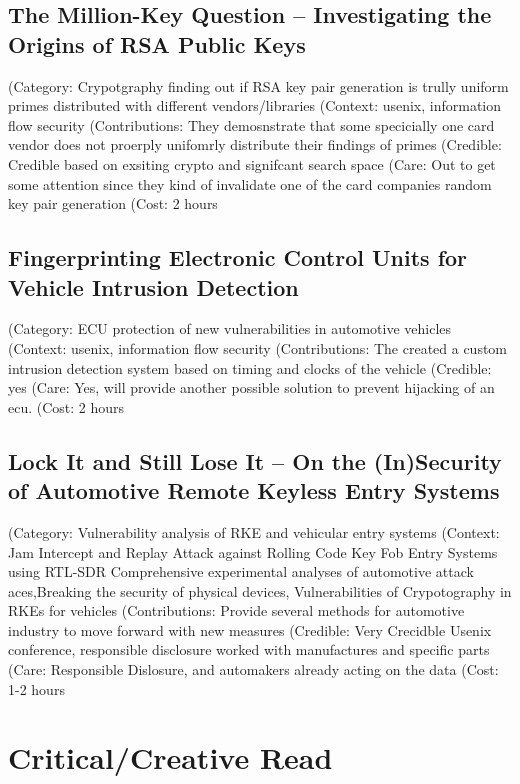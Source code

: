 \documentclass[conference]{journal}
\begin{document}
\subsection{The Million-Key Question – Investigating the Origins of RSA Public Keys \cite{svenda_million-key_2016}}
(Category:	Crypotgraphy finding out if RSA key pair generation is trully uniform primes distributed with different vendors/libraries	
(Context:	usenix, information flow security	
(Contributions:	They demosnstrate that some specicially one card vendor does not proerply unifomrly distribute their findings of primes	
(Credible:	Credible based on exsiting crypto and signifcant search space	
(Care:	Out to get some attention since they kind of invalidate one of the card companies random key pair generation	
(Cost:	2	hours

\subsection{Fingerprinting Electronic Control Units for Vehicle Intrusion Detection \cite{cho_fingerprinting_2016}}
(Category:	ECU protection of new vulnerabilities in automotive vehicles	
(Context:	usenix, information flow security	
(Contributions:	The created a custom intrusion detection system based on timing and clocks of the vehicle	
(Credible:	yes	
(Care:	Yes, will provide another possible solution to prevent hijacking of an ecu.	
(Cost:	2	hours

\subsection{Lock It and Still Lose It – On the (In)Security of Automotive Remote Keyless Entry Systems \cite{garcia_lock_2016}}
(Category:	Vulnerability analysis of RKE and vehicular entry systems
(Context:	Jam Intercept and Replay Attack against Rolling Code Key Fob Entry Systems using RTL-SDR Comprehensive experimental analyses of automotive attack aces,Breaking the security of physical devices, Vulnerabilities of Crypotography in RKEs for vehicles
(Contributions:	Provide several methods for automotive industry to move forward with new measures
(Credible:	Very Crecidble Usenix conference, responsible disclosure worked with manufactures and specific parts
(Care:	Responsible Dislosure, and automakers already acting on the data
(Cost:	1-2 hours


\section{Critical/Creative Read}
\end{document}
